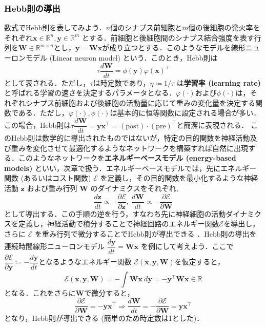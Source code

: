 \subsubsection{Hebb則の導出}
数式でHebb則を表してみよう．$n$個のシナプス前細胞と$m$個の後細胞の発火率をそれぞれ$\mathbf{x}\in \mathbb{R}^n, \mathbf{y}\in \mathbb{R}^m$ とする．前細胞と後細胞間のシナプス結合強度を表す行列を$\mathbf{W}\in \mathbb{R}^{m\times n}$とし，$\mathbf{y}=\mathbf{W}\mathbf{x}$が成り立つとする．このようなモデルを線形ニューロンモデル (Linear neuron model) という．このとき，Hebb則は
\begin{equation}
\tau\frac{d\mathbf{W}}{dt}=\phi(\mathbf{y})\varphi(\mathbf{x})^\top
\end{equation}
として表される．ただし，$\tau$は時定数であり，$\eta\coloneqq 1/\tau$ は\textbf{学習率 (learning rate)} と呼ばれる学習の速さを決定するパラメータとなる．$\varphi(\cdot)$および$\phi(\cdot)$は，それぞれシナプス前細胞および後細胞の活動量に応じて重みの変化量を決定する関数である．ただし，$\varphi(\cdot), \phi(\cdot)$は基本的に恒等関数に設定される場合が多い．この場合，Hebb則は$
\tau\dfrac{d\mathbf{W}}{dt}=\mathbf{y}\mathbf{x}^\top=(\text{post})\cdot (\text{pre})^\top
$と簡潔に表現される．
このHebb則は数学的に導出されたものではないが，特定の目的関数を神経活動及び重みを変化させて最適化するようなネットワークを構築すれば自然に出現する．このようなネットワークを\textbf{エネルギーベースモデル (energy-based models)} といい，次章で扱う．エネルギーベースモデルでは，先にエネルギー関数 (あるいはコスト関数) $\mathcal{E}$ を定義し，その目的関数を最小化するような神経活動 $\mathbf{z}$ および重み行列 $\mathbf{W}$ のダイナミクスをそれぞれ,
\begin{equation}
\frac{d \mathbf{z}}{dt}\propto-\frac{\partial \mathcal{E}}{\partial \mathbf{z}},\ \frac{d \mathbf{W}}{dt}\propto-\frac{\partial \mathcal{E}}{\partial \mathbf{W}}
\end{equation}
として導出する．この手順の逆を行う，すなわち先に神経細胞の活動ダイナミクスを定義し，神経活動で積分することで神経回路のエネルギー関数$\mathcal{E}$を導出し，さらに $\mathcal{E}$ を重み行列で微分することでHebb則が導出できる \citep{Isomura2020-sn}．Hebb則の導出を連続時間線形ニューロンモデル $\dfrac{d\mathbf{y}}{dt}=\mathbf{W}\mathbf{x}$ を例にして考えよう．ここで$\dfrac{\partial\mathcal{E}}{\partial\mathbf{y}}\coloneqq -\dfrac{d\mathbf{y}}{dt}$となるようなエネルギー関数 $\mathcal{E}(\mathbf{x}, \mathbf{y}, \mathbf{W})$を仮定すると，
\begin{equation}
\mathcal{E}(\mathbf{x}, \mathbf{y}, \mathbf{W})=-\int \mathbf{W}\mathbf{x}\ d\mathbf{y}=-\mathbf{y}^\top \mathbf{W}\mathbf{x} \in \mathbb{R}
\end{equation}
となる．これをさらに$\mathbf{W}$で微分すると，
\begin{equation}
\dfrac{\partial\mathcal{E}}{\partial\mathbf{W}}=-\mathbf{y}\mathbf{x}^\top\Rightarrow
\frac{d\mathbf{W}}{dt}=-\dfrac{\partial\mathcal{E}}{\partial\mathbf{W}}=\mathbf{y}\mathbf{x}^\top
\end{equation}
となり，Hebb則が導出できる (簡単のため時定数は1とした)．
